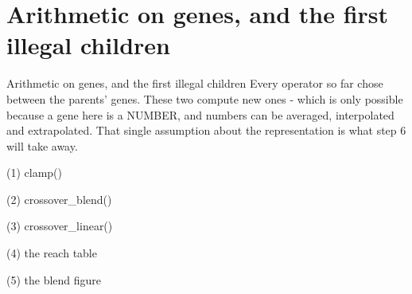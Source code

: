 
\section{Arithmetic on genes, and the first illegal children}

\begin{frame}{Arithmetic on genes, and the first illegal children}
Every operator so far chose between the parents' genes. These two compute new
ones - which is only possible because a gene here is a NUMBER, and numbers can
be averaged, interpolated and extrapolated. That single assumption about the
representation is what step 6 will take away.
\end{frame}

\begin{frame}[fragile]{(1) clamp()}

\end{frame}

\begin{frame}[fragile]{(2) crossover\_blend()}

\end{frame}

\begin{frame}[fragile]{(3) crossover\_linear()}

\end{frame}

\begin{frame}[fragile]{(4) the reach table}

\end{frame}

\begin{frame}[fragile]{(5) the blend figure}

\end{frame}

